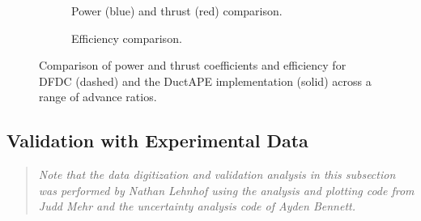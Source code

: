 \begin{figure}[h!]
     \centering
     \begin{subfigure}[t]{0.49\textwidth}
         \centering
        
        \caption{Power (blue) and thrust (red) comparison.}
        \label{fig:singlerotorcpct}
     \end{subfigure}
\hfill
     \begin{subfigure}[t]{0.49\textwidth}
         \centering
         
         \caption{Efficiency comparison.}
        \label{fig:singlerotoreta}
     \end{subfigure}
     \caption[DuctAPE power and thrust verification plots.]{Comparison of power and thrust coefficients and efficiency for DFDC (dashed) and the DuctAPE implementation (solid) across a range of advance ratios.}
    \label{fig:singlerotorcpcteta}
\end{figure}






\newpage
\subsection{Validation with Experimental Data}
\label{ssec:validation}

\begin{quote}
    \emph{\color{mediumgray}Note that the data digitization and validation analysis in this subsection was performed by Nathan Lehnhof using the analysis and plotting code from Judd Mehr and the uncertainty analysis code of Ayden Bennett.}
\end{quote}

